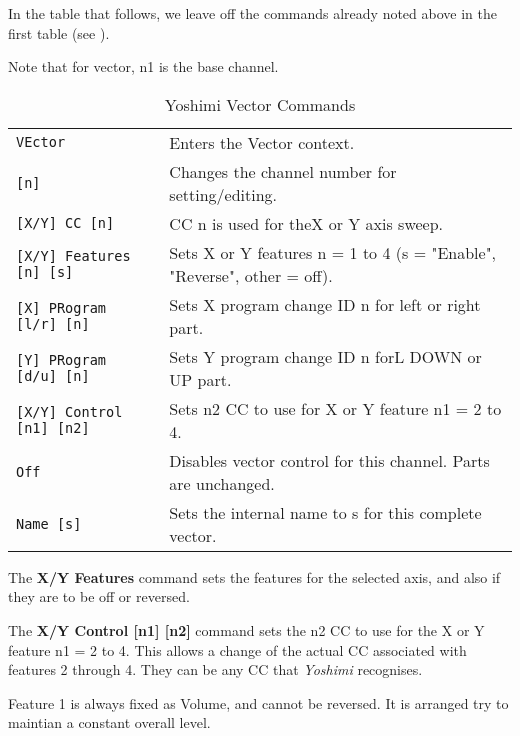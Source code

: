    In the table that follows, we leave off the commands already noted
   above in the first table
   (see ).

   Note that for vector, n1 is the base channel.

   \begin{table}[H]
      \centering
      \caption{Yoshimi Vector Commands}
      \label{table:yoshimi_text_vector_commands}
      \begin{tabular}{l l}

\texttt{VEctor} &
   Enters the Vector context. \\
   \texttt{[n]} &
   Changes the channel number for setting/editing.\\
\texttt{[X/Y] CC [n]} &
   CC n is used for theX or Y axis sweep. \\
\texttt{[X/Y] Features [n] [s]} &
   Sets X or Y features n = 1 to 4 (s = "Enable", "Reverse", other = off).  \\
\texttt{[X] PRogram [l/r] [n]} &
   Sets X program change ID n for left or right part. \\
\texttt{[Y] PRogram [d/u] [n]} &
   Sets Y program change ID n forL DOWN or UP part. \\
\texttt{[X/Y] Control [n1] [n2]} &
   Sets n2 CC to use for X or Y feature n1 = 2 to 4. \\
\texttt{Off} &
   Disables vector control for this channel.  Parts are unchanged. \\
\texttt{Name [s]} &
   Sets the internal name to s for this complete vector.  \\

      \end{tabular}
   \end{table}

   The \textbf{X/Y Features} command sets the features for the
   selected axis, and also if they are to be off or reversed.

   The \textbf{X/Y Control [n1] [n2]} command
   sets the n2 CC to use for the X or Y feature n1 = 2 to 4.
   This allows a change of the actual CC associated with features 2 through 4.
   They can be any CC that \textsl{Yoshimi} recognises.

   Feature 1 is always fixed as Volume, and cannot be reversed. It is arranged
   try to maintian a constant overall level.

